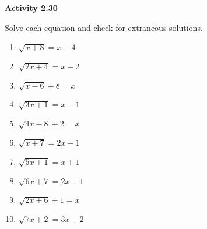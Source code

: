 \vspace{1ex}
\noindent\textbf{Activity 2.30}

\vspace{0.75ex}

Solve each equation and check for extraneous solutions.

\begin{multicols}{2}
\begin{enumerate}[noitemsep, label = \color{blue}\arabic*. ]
    \item \( \sqrt{x + 8} = x - 4 \)
    \item \( \sqrt{2x + 4} = x - 2 \)
    \item \( \sqrt{x - 6} + 8 = x \)
    \item \( \sqrt{3x + 1} = x - 1 \)
    \item \( \sqrt{4x - 8} + 2 = x \)
    \item \( \sqrt{x + 7} = 2x - 1 \)
    \item \( \sqrt{5x + 1} = x + 1 \)
    \item \( \sqrt{6x + 7} = 2x - 1 \)
    \item \( \sqrt{2x + 6} + 1 = x \)
    \item \( \sqrt{7x + 2} = 3x - 2 \)
\end{enumerate}
\end{multicols}

